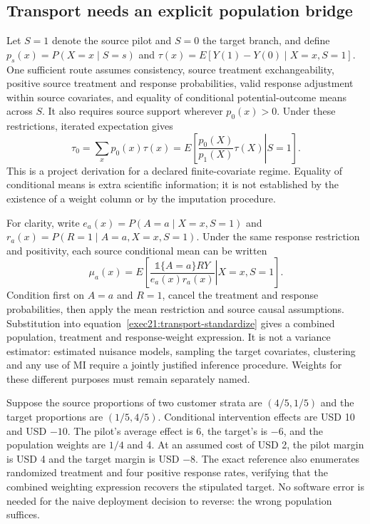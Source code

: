 \subsection{Transport needs an explicit population bridge}
\label{exec21:transport-target}

Let $S=1$ denote the source pilot and $S=0$ the target branch, and define
$p_s(x)=P(X=x\mid S=s)$ and
$\tau(x)=E[Y(1)-Y(0)\mid X=x,S=1]$. One sufficient route assumes consistency,
source treatment exchangeability, positive source treatment and response
probabilities, valid response adjustment within source covariates, and equality
of conditional potential-outcome means across $S$. It also requires source
support wherever $p_0(x)>0$. Under these restrictions, iterated expectation gives
\begin{equation}
 \tau_0=\sum_x p_0(x)\tau(x)
       =E\left[\left.\frac{p_0(X)}{p_1(X)}\tau(X)\right|S=1\right].
 \label{exec21:transport-standardize}
\end{equation}
This is a project derivation for a declared finite-covariate regime. Equality of
conditional means is extra scientific information; it is not established by
the existence of a weight column or by the imputation procedure.
\cite{exec21_transport_reference}

For clarity, write $e_a(x)=P(A=a\mid X=x,S=1)$ and
$r_a(x)=P(R=1\mid A=a,X=x,S=1)$. Under the same response restriction and
positivity, each source conditional mean can be written
\begin{equation}
 \mu_a(x)=E\left[\left.
       \frac{\mathbb{1}\{A=a\}RY}{e_a(x)r_a(x)}
       \right|X=x,S=1\right].
 \label{exec21:transport-response}
\end{equation}
Condition first on $A=a$ and $R=1$, cancel the treatment and response
probabilities, then apply the mean restriction and source causal assumptions.
Substitution into equation~\eqref{exec21:transport-standardize} gives a
combined population, treatment and response-weight expression. It is not a
variance estimator: estimated nuisance models, sampling the target covariates,
clustering and any use of MI require a jointly justified inference procedure.
Weights for these different purposes must remain separately named.

Suppose the source proportions of two customer strata are $(4/5,1/5)$ and the
target proportions are $(1/5,4/5)$. Conditional intervention effects are USD
10 and USD $-10$. The pilot's average effect is 6, the target's is $-6$, and
the population weights are $1/4$ and 4. At an assumed cost of USD 2, the pilot
margin is USD 4 and the target margin is USD $-8$. The exact reference also
enumerates randomized treatment and four positive response rates, verifying
that the combined weighting expression recovers the stipulated target.
No software error is needed for the naive deployment decision to reverse:
the wrong population suffices. \cite{exec21_transport_reference}

